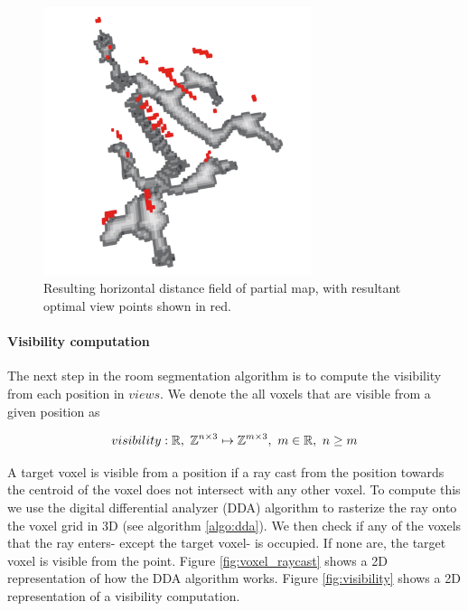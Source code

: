 \begin{figure}[h]
    \centering
    \includegraphics*[width=0.7\textwidth]{./fig/horizontal_distance_field.png}
    \caption{Resulting horizontal distance field of partial map, with resultant optimal view points shown in red.}
    \label{fig:hdf}
\end{figure}

\paragraph{Visibility computation}
The next step in the room segmentation algorithm is to compute the visibility from each position in \(views\). We denote the all voxels that are visible from a given position as 

\begin{equation}
    \label{eq:visibility}
    visibility: \mathbb{R},\ \voxelset \mapsto \mathbb{Z}^{m \times 3},\ m \in \mathbb{R},\ n \geq m
\end{equation}

A target voxel is visible from a position if a ray cast from the position towards the centroid of the voxel does not intersect with any other voxel. To compute this we use the digital differential analyzer (DDA) algorithm to rasterize the ray onto the voxel grid in 3D (see algorithm \ref{algo:dda}). We then check if any of the voxels that the ray enters- except the target voxel- is occupied. If none are, the target voxel is visible from the point. Figure \ref{fig:voxel_raycast} shows a 2D representation of how the DDA algorithm works. Figure \ref{fig:visibility} shows a 2D representation of a visibility computation.

